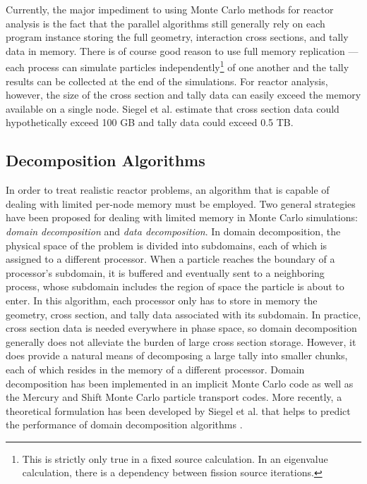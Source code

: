 \documentclass[3p,fleqn]{elsarticle}
\begin{document}
Currently, the major impediment to using Monte Carlo methods for reactor
analysis is the fact that the parallel algorithms still generally rely on each
program instance storing the full geometry, interaction cross sections, and
tally data in memory. There is of course good reason to use full memory
replication --- each process can simulate particles independently\footnote{This
  is strictly only true in a fixed source calculation. In an eigenvalue
  calculation, there is a dependency between fission source iterations.} of one
another and the tally results can be collected at the end of the
simulations. For reactor analysis, however, the size of the cross section and
tally data can easily exceed the memory available on a single node. Siegel et
al. \cite{jcp-siegel-2012-2} estimate that cross section data could
hypothetically exceed 100 GB and tally data could exceed 0.5 TB.

\subsection{Decomposition Algorithms}

In order to treat realistic reactor problems, an algorithm that is capable of
dealing with limited per-node memory must be employed. Two general strategies
have been proposed for dealing with limited memory in Monte Carlo simulations:
\emph{domain decomposition} and \emph{data decomposition}. In domain
decomposition, the physical space of the problem is divided into subdomains,
each of which is assigned to a different processor. When a particle reaches the
boundary of a processor's subdomain, it is buffered and eventually sent to a
neighboring process, whose subdomain includes the region of space the particle
is about to enter. In this algorithm, each processor only has to store in memory
the geometry, cross section, and tally data associated with its subdomain. In
practice, cross section data is needed everywhere in phase space, so domain
decomposition generally does not alleviate the burden of large cross section
storage. However, it does provide a natural means of decomposing a large tally
into smaller chunks, each of which resides in the memory of a different
processor. Domain decomposition has been implemented in an implicit Monte Carlo
code \cite{jcp-brunner-2009} as well as the Mercury \cite{mc09-greenman} and
Shift \cite{physor2012-mervin} Monte Carlo particle transport codes. More
recently, a theoretical formulation has been developed by Siegel et al. that
helps to predict the performance of domain decomposition algorithms
\cite{jcp-siegel-2012-1, jcp-siegel-2012-2}.
\end{document}

